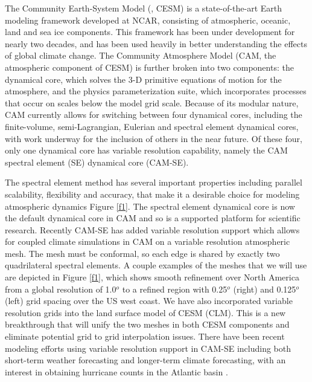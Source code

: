 \documentclass[11pt]{article}
\begin{document}
The Community Earth-System Model (\citet{hurrell2013community}, CESM) is a state-of-the-art Earth modeling framework developed at NCAR, consisting of atmospheric, oceanic, land and sea ice components. This framework has been under development for nearly two decades, and has been used heavily in better understanding the effects of global climate change. The Community Atmosphere Model (CAM, the atmospheric component of CESM) is further broken into two components: the dynamical core, which solves the 3-D primitive equations of motion for the atmosphere, and the physics parameterization suite, which incorporates processes that occur on scales below the model grid scale. Because of its modular nature, CAM currently allows for switching between four dynamical cores, including the finite-volume, semi-Lagrangian, Eulerian and spectral element dynamical cores, with work underway for the inclusion of others in the near future. Of these four, only one dynamical core has variable resolution capability, namely the CAM spectral element (SE) dynamical core (CAM-SE).

The spectral element method has several important properties including parallel scalability, flexibility and accuracy, that make it a desirable choice for modeling atmospheric dynamics Figure \ref{f1}.  The spectral element dynamical core \citet{fournier2004spectral, taylor2010compatible} is now the default dynamical core in CAM and so is a supported platform for scientific research. Recently CAM-SE has added variable resolution support which allows for coupled climate simulations in CAM on a variable resolution atmospheric mesh. The mesh must be conformal, so each edge is shared by exactly two quadrilateral spectral elements. A couple examples of the meshes that we will use are depicted in Figure \ref{f1}, which shows smooth refinement over North America from a global resolution of 1.0$^{o}$ to a refined region with 0.25$^{o}$ (right) and 0.125$^{o}$ (left) grid spacing over the US west coast.  We have also incorporated variable resolution grids into the land surface model of CESM (CLM).  This is a new breakthrough that will unify the two meshes in both CESM components and eliminate potential grid to grid interpolation issues.  There have been recent modeling efforts using variable resolution support in CAM-SE including both short-term weather forecasting and longer-term climate forecasting, with an interest in obtaining hurricane counts in the Atlantic basin \citep{zarzycki2014using}.
\end{document}
